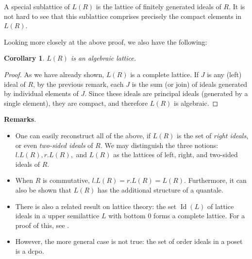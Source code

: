 \documentclass[12pt]{article}
\newtheorem{cor}{Corollary}
\begin{document}
A special sublattice of $L(R)$ is the lattice of finitely generated ideals of $R$.  It is not hard to see that this sublattice comprises precisely the compact elements in $L(R)$.

Looking more closely at the above proof, we also have the following:
\begin{cor}  $L(R)$ is an algebraic lattice. \end{cor}
\begin{proof}
As we have already shown, $L(R)$ is a complete lattice.  If $J$ is any (left) ideal of $R$, by the previous remark, each $J$ is the sum (or join) of ideals generated by individual elements of $J$.  Since these ideals are principal ideals (generated by a single element), they are compact, and therefore $L(R)$ is algebraic.
\end{proof}

\textbf{Remarks}.  
\begin{itemize}
\item
One can easily reconstruct all of the above, if $L(R)$ is the set of \emph{right ideals}, or even \emph{two-sided ideals} of $R$.  We may distinguish the three notions: $l.L(R),r.L(R),$ and $L(R)$ as the lattices of left, right, and two-sided ideals of $R$.
\item
When $R$ is commutative, $l.L(R)=r.L(R)=L(R)$.  Furthermore, it can also be shown that $L(R)$ has the additional structure of a quantale.
\item
There is also a related result on lattice theory: the set $\operatorname{Id}(L)$ of lattice ideals in a upper semilattice $L$ with bottom $0$ forms a complete lattice.  For a proof of this, see .
\item
However, the more general case is not true: the set of order ideals in a poset is a dcpo.
\end{itemize}
\end{document}
